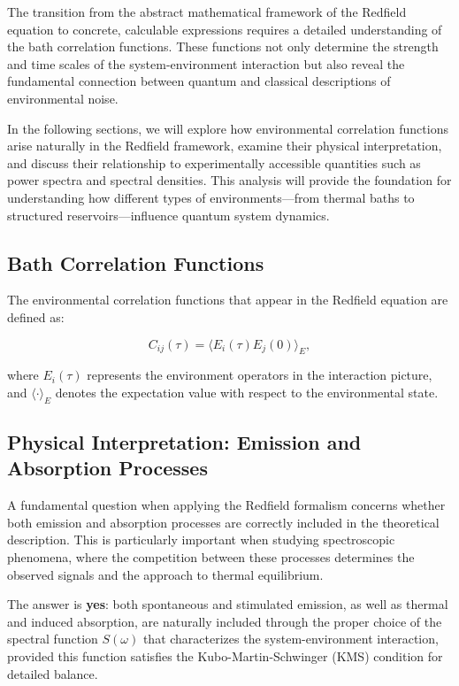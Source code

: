 The transition from the abstract mathematical framework of the Redfield equation to concrete, calculable expressions requires a detailed understanding of the bath correlation functions. These functions not only determine the strength and time scales of the system-environment interaction but also reveal the fundamental connection between quantum and classical descriptions of environmental noise.

In the following sections, we will explore how environmental correlation functions arise naturally in the Redfield framework, examine their physical interpretation, and discuss their relationship to experimentally accessible quantities such as power spectra and spectral densities. This analysis will provide the foundation for understanding how different types of environments—from thermal baths to structured reservoirs—influence quantum system dynamics.

\subsection{Bath Correlation Functions}

The environmental correlation functions that appear in the Redfield equation are defined as:

\begin{equation}
	C_{ij}(\tau) = \langle E_i(\tau) E_j(0) \rangle_E,
	\label{eq:bath_correlator_general}
\end{equation}

where $E_i(\tau)$ represents the environment operators in the interaction picture, and $\langle \cdot \rangle_E$ denotes the expectation value with respect to the environmental state.

\subsection{Physical Interpretation: Emission and Absorption Processes}

A fundamental question when applying the Redfield formalism concerns whether both emission and absorption processes are correctly included in the theoretical description. This is particularly important when studying spectroscopic phenomena, where the competition between these processes determines the observed signals and the approach to thermal equilibrium.

The answer is \textbf{yes}: both spontaneous and stimulated emission, as well as thermal and induced absorption, are naturally included through the proper choice of the spectral function $S(\omega)$ that characterizes the system-environment interaction, provided this function satisfies the Kubo-Martin-Schwinger (KMS) condition for detailed balance.

